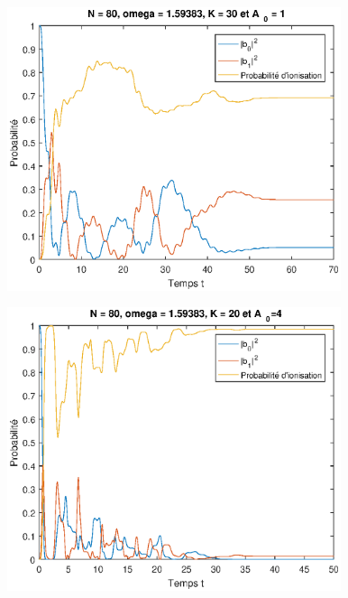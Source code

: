 \documentclass{report}
\begin{document}
\begin{figure}
\begin{center}
  \includegraphics[height=8.3cm]{N80_K30_A1.eps}
      \end{center}
  \caption{}
  \label{fig_N80_K30_A1}
\end{figure}

\begin{figure}
\begin{center}
  \includegraphics[height=8.3cm]{N80_K20_A4.eps}
      \end{center}
  \caption{}
  \label{fig_N80_K20_A4}
\end{figure}
\end{document}
